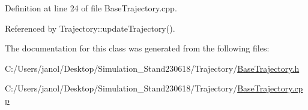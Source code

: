 Definition at line 24 of file Base\+Trajectory.\+cpp.



Referenced by Trajectory\+::update\+Trajectory().



The documentation for this class was generated from the following files\+:\begin{DoxyCompactItemize}
\item 
C\+:/\+Users/janol/\+Desktop/\+Simulation\+\_\+\+Stand230618/\+Trajectory/\hyperlink{_base_trajectory_8h}{Base\+Trajectory.\+h}\item 
C\+:/\+Users/janol/\+Desktop/\+Simulation\+\_\+\+Stand230618/\+Trajectory/\hyperlink{_base_trajectory_8cpp}{Base\+Trajectory.\+cpp}\end{DoxyCompactItemize}
